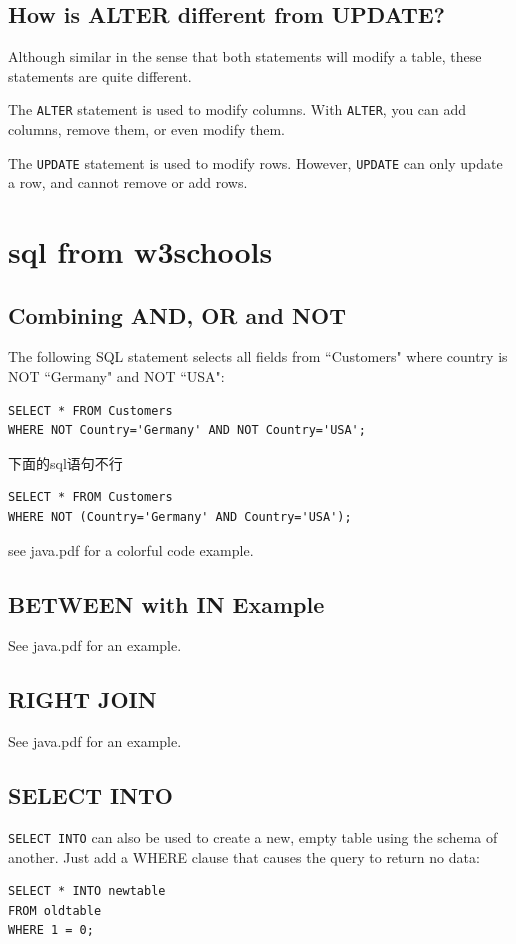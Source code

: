 \documentclass[a4paper, 12pt]{article}
\begin{document}
\subsection{How is ALTER different from UPDATE?}
Although similar in the sense that both statements will modify a table, these statements are quite different.

The \verb|ALTER| statement is used to modify columns. With \verb|ALTER|, you can add columns, remove them, or even modify them.

The \verb|UPDATE| statement is used to modify rows. However, \verb|UPDATE| can only update a row, and cannot remove or add rows.



\section{sql from w3schools}
\subsection{Combining AND, OR and NOT}
The following SQL statement selects all fields from ``Customers" where country is NOT ``Germany" and NOT ``USA":
\begin{verbatim}
SELECT * FROM Customers
WHERE NOT Country='Germany' AND NOT Country='USA';
\end{verbatim}

下面的sql语句不行
\begin{verbatim}
SELECT * FROM Customers 
WHERE NOT (Country='Germany' AND Country='USA');
\end{verbatim}

see java.pdf for a colorful code example.

\subsection{BETWEEN with IN Example}
See java.pdf for an example.

\subsection{RIGHT JOIN}
See java.pdf for an example.

\subsection{SELECT INTO}
\verb|SELECT INTO| can also be used to create a new, empty table using the schema of another. Just add a WHERE clause that causes the query to return no data:
\begin{verbatim}
SELECT * INTO newtable
FROM oldtable
WHERE 1 = 0;
\end{verbatim}
\end{document}

